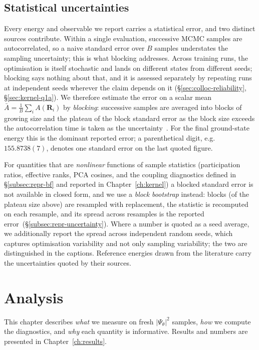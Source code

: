 \section{Statistical uncertainties}
\label{sec:uncertainties}
Every energy and observable we report carries a statistical error, and two distinct sources
contribute. Within a single evaluation, successive MCMC samples are autocorrelated, so a
naive standard error over $B$ samples understates the sampling uncertainty; this is what
blocking addresses. Across training runs, the optimisation is itself stochastic and lands on
different states from different seeds; blocking says nothing about that, and it is assessed
separately by repeating runs at independent seeds wherever the claim depends on it
(\S\ref{sec:colloc-reliability}, \S\ref{sec:kernel-q1a}). We therefore
estimate the error on a scalar mean $\bar A=\frac1B\sum_i A(\mathbf R_i)$ by
\emph{blocking}: successive samples are averaged into blocks of growing size and the
plateau of the block standard error as the block size exceeds the autocorrelation time is
taken as the uncertainty~\cite{FlyvbjergPetersen1989-Blocking,Jonsson2018-BlockingSE}. For
the final ground-state energy this is the dominant reported error; a parenthetical digit,
e.g.\ $155.8738(7)$, denotes one standard error on the last quoted figure.

For quantities that are \emph{nonlinear} functions of sample statistics (participation ratios, effective ranks, PCA cosines, and the coupling diagnostics defined in \S\ref{subsec:repr-bf} and reported in Chapter~\ref{ch:kernel}) a blocked standard error is not available in closed form, and we
use a \emph{block bootstrap} instead: blocks (of the plateau size above) are resampled with
replacement, the statistic is recomputed on each resample, and its spread across resamples
is the reported error~(\S\ref{subsec:repr-uncertainty}). Where a number is quoted as a
seed average, we additionally report the spread across independent random seeds, which captures optimisation variability and not only sampling variability; the two are distinguished in the
captions. Reference energies drawn from the literature carry the uncertainties quoted by
their sources.

\chapter{Analysis}
\label{ch:analysis}

This chapter describes \emph{what} we measure on fresh $|\Psi_\theta|^2$ samples, \emph{how} we compute the diagnostics, and \emph{why} each quantity is informative. Results and numbers are presented in Chapter~\ref{ch:results}.
